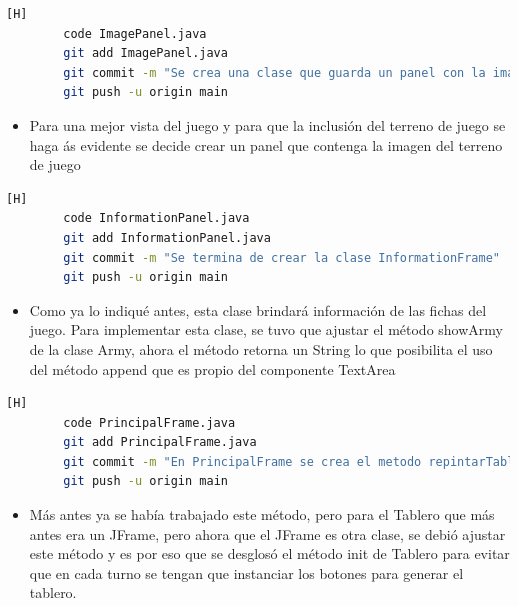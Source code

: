 \documentclass{article}
\begin{document}
	
	
	
		\begin{lstlisting}[language=bash,caption={Commit: 7da45c482b6b48a6732670061ff74b805bbb918b }][H]
		code ImagePanel.java
		git add ImagePanel.java
		git commit -m "Se crea una clase que guarda un panel con la imagen del terreno de juego"			
		git push -u origin main
	\end{lstlisting}
	
	
	\begin{itemize}
		\item Para una mejor vista del juego y para que la inclusión del terreno de juego se haga ás evidente se decide crear un panel que contenga la imagen del terreno de juego
	\end{itemize}
	
	
	
		\begin{lstlisting}[language=bash,caption={Commit: 9b77c00a6e01010ff2d606dede8ea4c308d9d171 }][H]
		code InformationPanel.java
		git add InformationPanel.java
		git commit -m "Se termina de crear la clase InformationFrame"			
		git push -u origin main
	\end{lstlisting}
	
	
	\begin{itemize}
		\item Como ya lo indiqué antes, esta clase brindará información de las fichas del juego. Para implementar esta clase, se tuvo que ajustar el método showArmy de la clase Army, ahora el método retorna un String  lo que posibilita el uso del método append que es propio del componente TextArea
	\end{itemize}



	
			\begin{lstlisting}[language=bash,caption={Commit: dfb62d171edfd03b8e1722678caa25077d55fb89 }][H]
		code PrincipalFrame.java
		git add PrincipalFrame.java
		git commit -m "En PrincipalFrame se crea el metodo repintarTablero"			
		git push -u origin main
	\end{lstlisting}
	
	
	\begin{itemize}
		\item Más antes ya se había trabajado este método, pero para el Tablero que más antes era un JFrame, pero ahora que el JFrame es otra clase, se debió ajustar este método y es por eso que se desglosó el método init de Tablero para evitar que en cada turno se tengan que instanciar los botones para generar el tablero. 
	\end{itemize}
	
\end{document}
